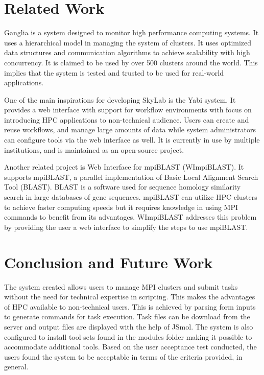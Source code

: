\section{Related Work}
Ganglia is a system designed to monitor high performance computing systems. It uses a hierarchical model in managing the system of clusters. It uses optimized data structures and communication algorithms to achieve scalability with high concurrency. It is claimed to be used by over 500 clusters around the world. This implies that the system is tested and trusted to be used for real-world applications\cite{1395654820040701}.
	    
One of the main inspirations for developing SkyLab is the Yabi system. It provides a web interface with support for workflow environments with focus on introducing HPC applications to non-technical audience. Users can create and reuse workflows, and manage large amounts of data while system administrators can configure tools via the web interface as well. It is currently in use by multiple institutions, and is maintained as an open-source project\cite{7411021620120101}.	    	    
	    
Another related project is Web Interface for mpiBLAST (WImpiBLAST). It supports mpiBLAST, a parallel implementation of Basic Local Alignment Search Tool (BLAST). BLAST is a software used for sequence homology similarity search in large databases of gene sequences. mpiBLAST can utilize HPC clusters to achieve faster computing speeds but it requires knowledge in using MPI commands to benefit from its advantages. WImpiBLAST addresses this problem by providing the user a web interface to simplify the steps to use mpiBLAST\cite{9686120720140601}.   
	
\section{Conclusion and Future Work}
The system created allows users to manage MPI clusters and submit tasks without the need for technical expertise in scripting. This makes the advantages of HPC available to non-technical users. This is achieved by parsing form inputs to generate commands for task execution. Task files can be download from the server and output files are displayed with the help of JSmol\cite{IJCH:IJCH201300024}. The system is also configured to install tool sets found in the modules folder making it possible to accommodate additional tools. Based on the user acceptance test conducted, the users found the system to be acceptable in terms of the criteria provided, in general. 

